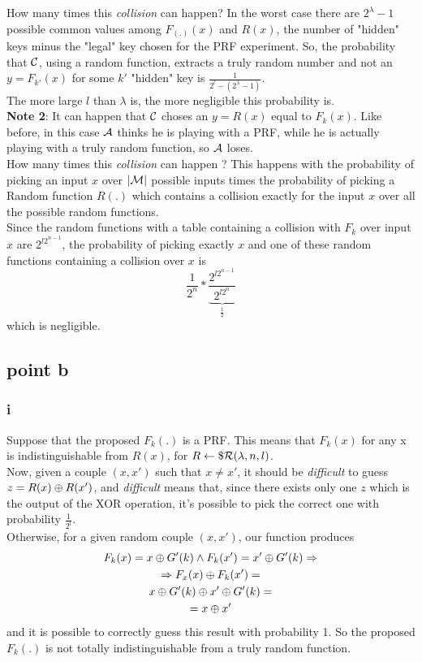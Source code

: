 \documentclass[11pt]{article}
\newcounter{t0d0_counter}
\begin{document}
How many times this \textit{collision}  can happen? In the worst case there are
$2^{\lambda}-1$ possible common values among $F_{(.)}(x)$ and $R(x)$, the number
of "hidden" keys minus the "legal" key chosen for the PRF experiment. So, the
probability that $\mathcal{C}$, using a random function,  extracts a truly random number
and not an $y=F_{k'}(x)$ for some $k'$ "hidden" key is
$\frac{1}{2^{l}-(2^{\lambda}-1)}$.\\
The more large $l$ than $\lambda$ is, the more negligible this probability is.\\



\textbf{Note 2}: It can happen that $\mathcal{C}$ choses an $y=R(x)$ equal to $F_{k}(x)$.
Like before, in this case $\mathcal{A}$ thinks he is playing with a PRF, while he is
actually playing with a truly random function, so $\mathcal{A}$ loses.\\

How many times this \textit{collision}  can happen ? This happens with the
probability of picking
an input $x$ over $|\mathcal{M}|$ possible inputs times the probability of picking a
Random function $R(.)$ which contains a collision exactly for the input $x$ over
all the possible random functions.\\
Since the random functions with a table containing a collision with $F_{k}$
over input $x$ are $ 2^{l 2^{n-1}} $, the probability of picking exactly $x$ and
one of these random functions containing a collision over $x$ is 
\[
    \frac{1}{2^{n}} * \underbrace{\frac{2^{l 2^{n-1}}}{2^{l
2^{n}}}}_{\frac{1}{2}}
\]
which is negligible.
\subsection{point b}
\subsubsection{i}

Suppose that the proposed $F_{k}(.)$ is a PRF. This means that $F_{k}(x)$ for
any x is indistinguishable from $R(x)$, for $R \leftarrow\$ \mathcal{R}(\lambda, n, l)$.\\
Now, given a couple $(x,x')$ such that $x \not= x'$, it should be
\textit{difficult}  to
guess $z=R(x) \oplus R(x')$, and \textit{difficult} means that, since there exists
only one $z$ which is the output of the XOR operation, it's possible to pick the
correct one with probability $\frac{1}{2^{l}}$.\\
Otherwise, for a given random couple $(x, x')$, our function produces
    \begin{gather*}
        F_{k}(x)=x \oplus G'(k) \wedge F_{k}(x')=x' \oplus G'(k) \Rightarrow\\
        \Rightarrow F_{x}(x) \oplus F_{k}(x') = \\
        x \oplus G'(k) \oplus x' \oplus G'(k) =\\
        =x \oplus x'
    \end{gather*}
and it is possible to correctly guess this result with probability 1. 
So the proposed $F_{k}(.)$ is not totally indistinguishable from a truly random
function.
\end{document}
